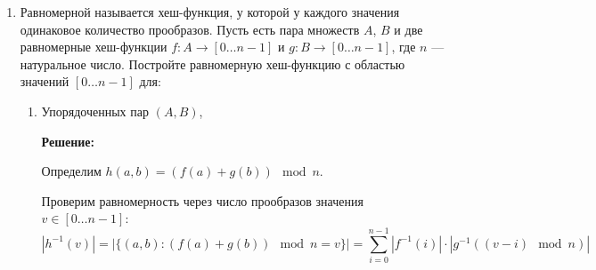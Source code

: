 \begin{enumerate}
\begin{enumerate}
\begin{itemize}
          \item \textbf{Один список пустой.}
          Пусть $l=[]$, а $|l'|=m\ge 1$.
          Тогда
          $$h([])=c,\qquad h(l')=c\oplus f_0(l'_0)\oplus\cdots\oplus f_{m-1}(l'_{m-1}).$$
          Обозначим
          $$F=f_0(l'_0)\oplus\cdots\oplus f_{m-1}(l'_{m-1}).$$
          Поскольку хотя бы одно слагаемое (например, $f_0(l'_0)$) равномерно и независимо от остальных,
          $F$ равномерно в $\F_2^n$.
          Поэтому
          $$\Pr[h([])=y_1,\;h(l')=y_2]
          =\Pr[c=y_1,\;F=y_1\oplus y_2]
          =\Pr[c=y_1]\Pr[F=y_1\oplus y_2]
          =\frac{1}{2^{2n}}.$$

          \item \textbf{$0<|l|<|l'|$.}
          Пусть $|l|=m_1$, $|l'|=m_2$, $m_1<m_2$.
          В $h(l')$ есть слагаемое $f_{m_1}(l'_{m_1})$, которого нет в $h(l)$.
          Запишем
          $$h(l') = S \oplus f_{m_1}(l'_{m_1}),\qquad
          S = c \oplus \bigoplus_{j\ne m_1,\;0\le j<m_2} f_j(l'_j).$$
          Тогда
          $$\Pr[h(l)=y_1,\;h(l')=y_2]$$
          $$= \mathbb E_{h(l),S}\!\left[\mathbf 1[h(l)=y_1]\cdot
          \Pr\!\left(f_{m_1}(l'_{m_1})=y_2\oplus S \mid h(l),S\right)\right].$$
          Условная вероятность равна $\frac{1}{2^n}$ (равномерность и независимость $f_{m_1}$), значит
          $$= \frac{1}{2^n}\Pr[h(l)=y_1].$$
          А $\Pr[h(l)=y_1]=\frac{1}{2^n}$, потому что $h(l)=c\oplus(\cdots)$ и $c$ равномерна.
          Итого снова $\frac{1}{2^{2n}}$.
        \end{itemize}

        Во всех случаях получили нужную вероятность, значит семейство 2-независимо.

    \end{enumerate}

  \item
	Равномерной называется хеш-функция, у которой у каждого значения одинаковое количество прообразов.
	Пусть есть пара множеств $A$, $B$ и две равномерные хеш-функции $f : A \rightarrow [0 \dots n-1]$ и
	$g : B \rightarrow [0 \dots n-1]$, где $n$ --- натуральное число.
	Постройте равномерную хеш-функцию с областью значений $[0 \dots n-1]$ для:
	\begin{enumerate}
	  \item Упорядоченных пар $(A, B)$,
	  
    \textbf{Решение:}

    Определим $h(a, b) = (f(a) + g(b)) \mod n$.

    Проверим равномерность через число прообразов значения $v \in [0 \ldots n-1]$:
    $$|h^{-1}(v)| = |\{(a, b) : (f(a) + g(b)) \mod n = v\}| = \sum_{i=0}^{n-1} |f^{-1}(i)| \cdot |g^{-1}((v - i) \mod n)|$$


\end{enumerate}
\end{enumerate}
